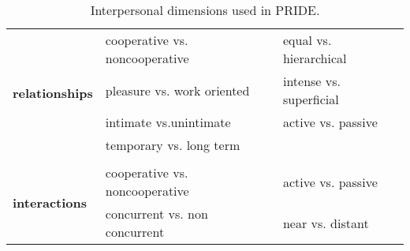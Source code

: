 \begin{table}[t!]
\centering
\begin{adjustbox}{width=0.7\textwidth}
\begin{tabular}{@{}l@{\hskip 0.2in}@{\vline}@{\hskip 0.2in}l@{\hskip 0.3in}l@{}}
\multirow{4}{*}{\textbf{relationships}} & cooperative vs. noncooperative & equal vs. hierarchical\\ 
 & pleasure vs. work oriented & intense vs. superficial \\ 
 & intimate vs.unintimate & active vs. passive \\ 
 & temporary vs. long term \\ \hline & \\[-2.0ex]
\multirow{2}{*}{\textbf{interactions}}  & cooperative vs. noncooperative & active vs. passive \\ 
 & concurrent vs. non concurrent & near vs. distant \\                                                          
\end{tabular}
\end{adjustbox}
\caption{Interpersonal dimensions used in PRIDE.}
\label{dimensions}
\end{table}


